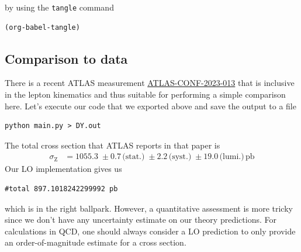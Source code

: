 \documentclass[11pt]{article}
\begin{document}
by using the \texttt{tangle} command
\begin{verbatim}
(org-babel-tangle)
\end{verbatim}

\subsection{Comparison to data}
\label{sec:org6ea461c}
There is a recent ATLAS measurement \href{https://atlas.web.cern.ch/Atlas/GROUPS/PHYSICS/CONFNOTES/ATLAS-CONF-2023-013/}{ATLAS-CONF-2023-013} that is inclusive in the lepton kinematics and thus suitable for performing a simple comparison here.
Let's execute our code that we exported above and save the output to a file
\begin{verbatim}
python main.py > DY.out
\end{verbatim}
The total cross section that ATLAS reports in that paper is
\begin{align}
  \sigma_\mathrm{Z}
  &=
  1055.3 \;\pm 0.7 \,\text{(stat.)} \;\pm 2.2 \,\text{(syst.)} \;\pm 19.0 \,\text{(lumi.)} \,\mathrm{pb}
\end{align}
Our LO implementation gives us
\begin{verbatim}
#total 897.1018242299992 pb
\end{verbatim}

which is in the right ballpark.
However, a quantitative assessment is more tricky since we don't have any uncertainty estimate on our theory predictions.
For calculations in QCD, one should always consider a LO prediction to only provide an order-of-magnitude estimate for a cross section.
\end{document}
